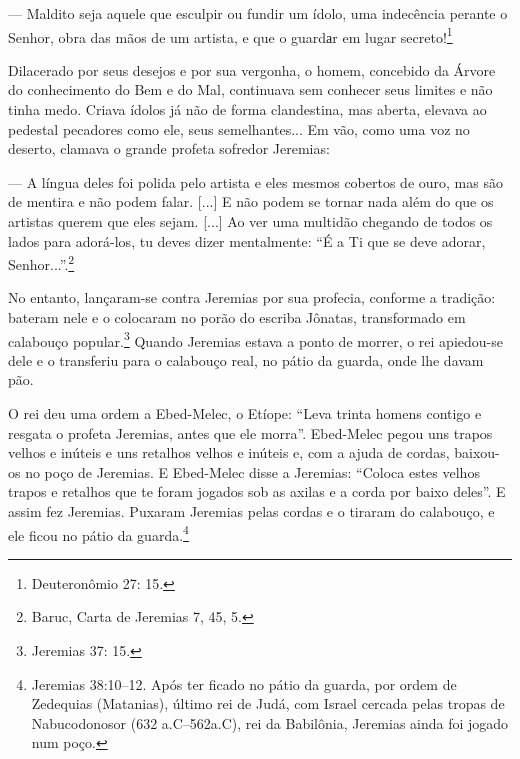 --- Maldito seja aquele que esculpir ou fundir um ídolo, uma indecência
perante o Senhor, obra das mãos de um artista, e que o guardаr em lugar
secreto!\footnote{Deuteronômio 27: 15.}

Dilacerado por seus desejos e por sua vergonha, o homem, concebido da
Árvore do conhecimento do Bem e do Mal, continuava sem conhecer seus
limites e não tinha medo. Criava ídolos já não de forma clandestina, mas
aberta, elevava ao pedestal pecadores como ele, seus semelhantes... Em
vão, como uma voz no deserto, clamava o grande profeta sofredor
Jeremias:

--- A língua deles foi polida pelo artista e eles mesmos cobertos de
ouro, mas são de mentira e não podem falar. {[}...{]} E não podem se
tornar nada além do que os artistas querem que eles sejam. {[}...{]} Ao
ver uma multidão chegando de todos os lados para adorá-los, tu deves
dizer mentalmente: ``É a Ti que se deve adorar, Senhor...''.\footnote{Baruc,
  Carta de Jeremias 7, 45, 5.}

No entanto, lançaram-se contra Jeremias por sua profecia, conforme a
tradição: bateram nele e o colocaram no porão do escriba Jônatas,
transformado em calabouço popular.\footnote{Jeremias 37: 15.} Quando
Jeremias estava a ponto de morrer, o rei apiedou-se dele e o transferiu
para o calabouço real, no pátio da guarda, onde lhe davam pão.

O rei deu uma ordem a Ebed-Melec, o Etíope: ``Leva trinta homens contigo
e resgata o profeta Jeremias, antes que ele morra''. Ebed-Melec pegou
uns trapos velhos e inúteis e uns retalhos velhos e inúteis e, com a
ajuda de cordas, baixou-os no poço de Jeremias. E Ebed-Melec disse a
Jeremias: ``Coloca estes velhos trapos e retalhos que te foram jogados
sob as axilas e a corda por baixo deles''. E assim fez Jeremias. Puxaram
Jeremias pelas cordas e o tiraram do calabouço, e ele ficou no pátio da
guarda.\footnote{Jeremias 38:10--12. Após ter ficado no pátio da guarda,
  por ordem de Zedequias (Matanias), último rei de Judá, com Israel
  cercada pelas tropas de Nabucodonosor (632 a.C--562a.C), rei da
  Babilônia, Jeremias ainda foi jogado num poço.}

